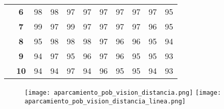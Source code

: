\begin{table}[h]
{\begin{tabular}{ccrrrrrrrrr}
\multicolumn{1}{c|}{} & \multicolumn{1}{c|}{\textbf{6}} & \multicolumn{1}{r|}{98} & \multicolumn{1}{r|}{98} & \multicolumn{1}{r|}{97} & \multicolumn{1}{r|}{97} & \multicolumn{1}{r|}{97} & \multicolumn{1}{r|}{97} & \multicolumn{1}{r|}{97} & \multicolumn{1}{r|}{97} & \multicolumn{1}{r|}{95} \\ \cline{2-11}
\multicolumn{1}{c|}{} & \multicolumn{1}{c|}{\textbf{7}} & \multicolumn{1}{r|}{99} & \multicolumn{1}{r|}{97} & \multicolumn{1}{r|}{99} & \multicolumn{1}{r|}{97} & \multicolumn{1}{r|}{97} & \multicolumn{1}{r|}{97} & \multicolumn{1}{r|}{97} & \multicolumn{1}{r|}{96} & \multicolumn{1}{r|}{95} \\ \cline{2-11}
\multicolumn{1}{c|}{} & \multicolumn{1}{c|}{\textbf{8}} & \multicolumn{1}{r|}{95} & \multicolumn{1}{r|}{98} & \multicolumn{1}{r|}{98} & \multicolumn{1}{r|}{98} & \multicolumn{1}{r|}{97} & \multicolumn{1}{r|}{96} & \multicolumn{1}{r|}{96} & \multicolumn{1}{r|}{95} & \multicolumn{1}{r|}{94} \\ \cline{2-11}
\multicolumn{1}{c|}{} & \multicolumn{1}{c|}{\textbf{9}} & \multicolumn{1}{r|}{94} & \multicolumn{1}{r|}{97} & \multicolumn{1}{r|}{95} & \multicolumn{1}{r|}{96} & \multicolumn{1}{r|}{97} & \multicolumn{1}{r|}{96} & \multicolumn{1}{r|}{95} & \multicolumn{1}{r|}{95} & \multicolumn{1}{r|}{93} \\ \cline{2-11}
\multicolumn{1}{c|}{} & \multicolumn{1}{c|}{\textbf{10}} & \multicolumn{1}{r|}{94} & \multicolumn{1}{r|}{94} & \multicolumn{1}{r|}{97} & \multicolumn{1}{r|}{94} & \multicolumn{1}{r|}{96} & \multicolumn{1}{r|}{95} & \multicolumn{1}{r|}{95} & \multicolumn{1}{r|}{94} & \multicolumn{1}{r|}{93} \\ \cline{2-11}
\end{tabular}%
}
\end{table}

\begin{figure}[h]
\texttt{[image: aparcamiento\_pob\_vision\_distancia.png]}
\texttt{[image: aparcamiento\_pob\_vision\_distancia\_linea.png]}
\centering
\end{figure}
